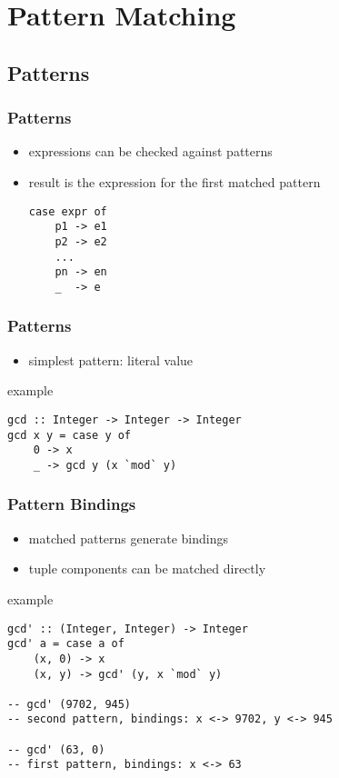 \documentclass[dvipsnames]{beamer}
\theoremstyle{plain}
\begin{document}
\section{Pattern Matching}

\subsection{Patterns}

\begin{frame}[fragile]
  \frametitle{Patterns}

  \begin{itemize}
    \item expressions can be checked against patterns
    \item result is the expression for the first matched pattern

    \medskip
    \begin{lstlisting}
case expr of
    p1 -> e1
    p2 -> e2
    ...
    pn -> en
    _  -> e
    \end{lstlisting}
  \end{itemize}
\end{frame}

\begin{frame}[fragile]
  \frametitle{Patterns}

  \begin{itemize}
    \item simplest pattern: literal value
  \end{itemize}

  \begin{exampleblock}{example}
    \begin{lstlisting}
gcd :: Integer -> Integer -> Integer
gcd x y = case y of
    0 -> x
    _ -> gcd y (x `mod` y)
    \end{lstlisting}
  \end{exampleblock}
\end{frame}

\begin{frame}[fragile]
  \frametitle{Pattern Bindings}

  \begin{itemize}
    \item matched patterns generate bindings
    \item tuple components can be matched directly
  \end{itemize}

  \begin{exampleblock}{example}
    \begin{lstlisting}
gcd' :: (Integer, Integer) -> Integer
gcd' a = case a of
    (x, 0) -> x
    (x, y) -> gcd' (y, x `mod` y)

-- gcd' (9702, 945)
-- second pattern, bindings: x <-> 9702, y <-> 945

-- gcd' (63, 0)
-- first pattern, bindings: x <-> 63
    \end{lstlisting}
  \end{exampleblock}
\end{frame}
\end{document}

